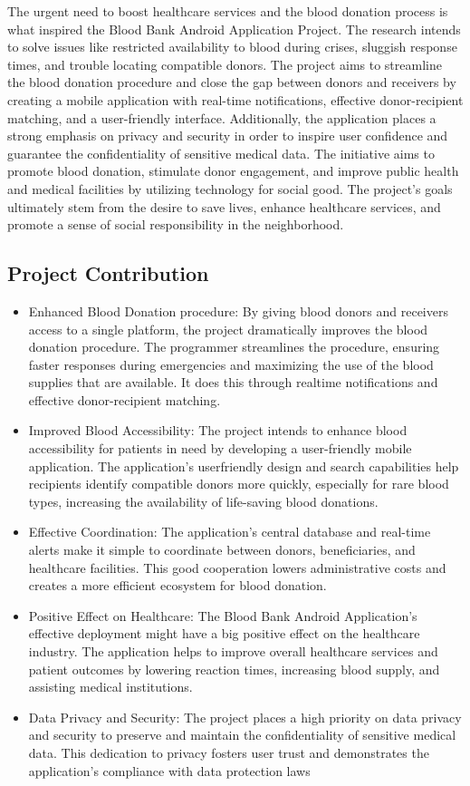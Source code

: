 The urgent need to boost healthcare services and the blood donation process is what inspired
the Blood Bank Android Application Project. The research intends to solve issues like restricted
availability to blood during crises, sluggish response times, and trouble locating compatible
donors. The project aims to streamline the blood donation procedure and close the gap between
donors and receivers by creating a mobile application with real-time notifications, effective
donor-recipient matching, and a user-friendly interface. Additionally, the application places a
strong emphasis on privacy and security in order to inspire user confidence and guarantee the
confidentiality of sensitive medical data. The initiative aims to promote blood donation, stimulate 
donor engagement, and improve public health and medical facilities by utilizing technology for
social good. The project's goals ultimately stem from the desire to save lives, enhance healthcare
services, and promote a sense of social responsibility in the neighborhood.
\subsection{Project Contribution}
\begin{itemize}
    \item Enhanced Blood Donation procedure: By giving blood donors and receivers access to a
single platform, the project dramatically improves the blood donation procedure. The
programmer streamlines the procedure, ensuring faster responses during emergencies
and maximizing the use of the blood supplies that are available. It does this through realtime notifications and effective donor-recipient matching.
\item Improved Blood Accessibility: The project intends to enhance blood accessibility for
patients in need by developing a user-friendly mobile application. The application's userfriendly design and search capabilities help recipients identify compatible donors more
quickly, especially for rare blood types, increasing the availability of life-saving blood
donations.
\item Effective Coordination: The application's central database and real-time alerts make it
simple to coordinate between donors, beneficiaries, and healthcare facilities. This good
cooperation lowers administrative costs and creates a more efficient ecosystem for blood
donation.
\item Positive Effect on Healthcare: The Blood Bank Android Application's effective deployment
might have a big positive effect on the healthcare industry. The application helps to
improve overall healthcare services and patient outcomes by lowering reaction times,
increasing blood supply, and assisting medical institutions.
\item Data Privacy and Security: The project places a high priority on data privacy and security
to preserve and maintain the confidentiality of sensitive medical data. This dedication to
privacy fosters user trust and demonstrates the application's compliance with data
protection laws
\end{itemize}
